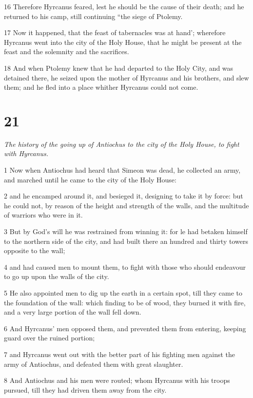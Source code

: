 16 Therefore Hyrcanus feared, lest he should be the cause of their death; and he returned to his camp, still continuing “the siege of Ptolemy. 

17 Now it happened, that the feast of tabernacles was at hand’; wherefore Hyrcanus went into the city of the Holy House, that he might be present at the feast and the solemnity and the sacrifices. 

18 And when Ptolemy knew that he had departed to the Holy City, and was detained there, he seized upon the mother of Hyrcanus and his brothers, and slew them; and he fled into a place whither Hyrcanus could not come. 



\chapter{21}

\par \textit{The history of the going up of Antiochus to the city of the Holy House, to fight with Hyrcanus.}

1 Now when Antiochus had heard that Simeon was dead, he collected an army, and marched until he came to the city of the Holy House: 

2 and he encamped around it, and besieged it, designing to take it by force: but he could not, by reason of the height and strength of the walls, and the multitude of warriors who were in it. 

3 But by God’s will he was restrained from winning it: for le had betaken himself to the northern side of the city, and had built there an hundred and thirty towers opposite to the wall; 

4 and had caused men to mount them, to fight with those who should endeavour to go up upon the walls of the city. 

5 He also appointed men to dig up the earth in a certain spot, till they came to the foundation of the wall: which finding to be of wood, they burned it with fire, and a very large portion of the wall fell down. 

6 And Hyrcanus’ men opposed them, and prevented them from entering, keeping guard over the ruined portion; 

7 and Hyrcanus went out with the better part of his fighting men against the army of Antiochus, and defeated them with great slaughter. 

8 And Antiochus and his men were routed; whom Hyrcanus with his troops pursued, till they had driven them away from the city. 

